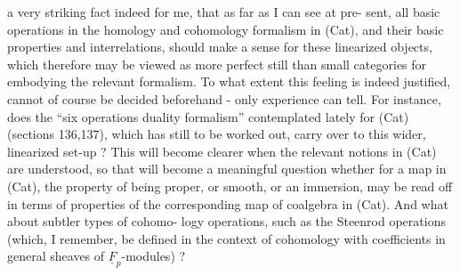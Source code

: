 
a very striking fact indeed for me, that as far as I can see at pre-%
sent, all basic operations in the  homology and cohomology formalism
in (Cat), and their basic properties and interrelations, should make
a sense for these linearized objects, which therefore may be viewed
as more perfect   still than small categories for embodying the
relevant formalism. To what extent this feeling is indeed justified,
cannot of course be decided beforehand - only experience can tell.
For instance, does the ``six operations duality formalism'' contemplated
lately for (Cat) (sections 136,137), which has still to be worked
out, carry over to this wider, linearized  set-up ? This
will become clearer when the relevant notions in (Cat) are understood,
so that  will become a meaningful question whether  for a map
in (Cat), the property of being proper, or smooth, or an immersion,
may be read off in terms of properties of the corresponding map of
coalgebra \deleted{,} in (Cat). And what about subtler types of cohomo-%
logy operations, such as the Steenrod operations (which, I remember,
 be defined in the context of cohomology with coefficients in
general sheaves of $\underline{F}_p$-modules) ?

